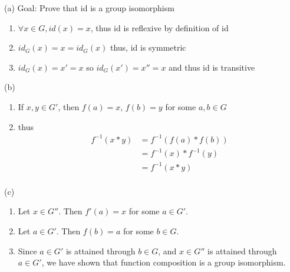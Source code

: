 
(a) Goal: Prove that id is a group isomorphism

\begin{enumerate}[nosep]
\item[] $\forall x \in G, id(x) = x$, thus id is reflexive by definition of id \\
\item[] $id_G(x) = x = id_G(x)$ thus, id is symmetric \\
\item[] $id_G(x) = x' = x$ so $id_G(x') = x'' = x$ and thus id is transitive \\
\end{enumerate}

(b)
\begin{enumerate}[nosep]
\item[] If $x,y \in G'$, then $ f(a)= x$, $f(b) = y$ for some $a,b \in G$
\item[] thus \begin{align*}
  f^{-1}(x * y) &= f^{-1}(f(a) * f(b)) \\
  &= f^{-1}(x) * f^{-1}(y) \\
  &= f^{-1}(x * y) \\
\end{align*}
\end{enumerate}

(c)
\begin{enumerate}[nosep]
\item[] Let $x \in G''$. Then $f'(a) = x$ for some $a \in G'$. 
\item[] Let $a \in G'$. Then $f(b) = a$ for some $b \in G$.
\item[] Since $a \in G'$ is attained through $b \in G$, and $x \in G''$ is attained through
  $a \in G'$, we have shown that function composition is a group isomorphism.
\end{enumerate}
